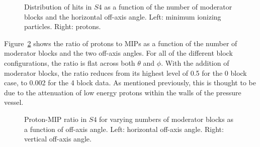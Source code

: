 \begin{figure}[!ht]
  \begin{minipage}[t]{0.48\textwidth}
    \begin{adjustbox}{max totalsize={\textwidth}{.35\textheight},center}
      
    \end{adjustbox}
    
  \end{minipage}
  \hspace{0.3cm}
  \begin{minipage}[t]{0.48\textwidth}
    \begin{adjustbox}{max totalsize={\textwidth}{.35\textheight},center}
      
    \end{adjustbox}
  \end{minipage} 
  \caption{\label{fig:thetas4mip}Distribution of hits in $\mathit{S4}$ as a function of the number of moderator blocks and the horizontal off-axis angle. Left: minimum ionizing particles. Right: protons.}
\end{figure}	

Figure~\ref{fig:propiratio_s4_horz} shows the ratio of protons to MIPs as a function of the number of moderator blocks and the two off-axis angles.
For all of the different block configurations, the ratio is flat across both $\theta$ and $\phi$.
With the addition of moderator blocks, the ratio reduces from its highest level of 0.5 for the 0 block case, to 0.002 for the 4 block data.
As mentioned previously, this is thought to be due to the attenuation of low energy protons within the walls of the pressure vessel.

\begin{figure}[!ht]
  \begin{minipage}[t]{0.48\textwidth}
    \begin{adjustbox}{max totalsize={\textwidth}{.35\textheight}, center}
      
    \end{adjustbox}
  \end{minipage}
  \hspace{0.3cm}
  \begin{minipage}[t]{0.48\textwidth}
    \begin{adjustbox}{max totalsize={\textwidth}{.35\textheight}, center}
      
    \end{adjustbox}
  \end{minipage}	
  \caption{\label{fig:propiratio_s4_horz}Proton-MIP ratio in $\mathit{S4}$ for varying numbers of moderator blocks as a function of off-axis angle. Left: horizontal off-axis angle. Right: vertical off-axis angle.}
\end{figure}

